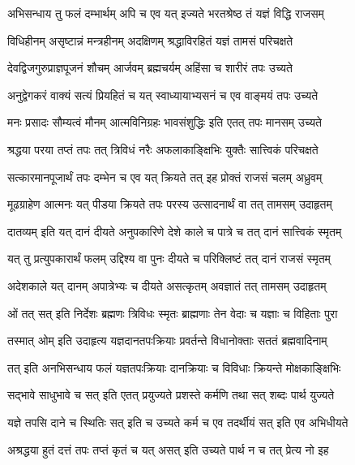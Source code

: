 \twolineshloka
{अभिसन्धाय तु फलं दम्भार्थम् अपि च एव यत्}
{इज्यते भरतश्रेष्ठ तं यज्ञं विद्धि राजसम्}%

\twolineshloka
{विधिहीनम् असृष्टान्नं मन्त्रहीनम् अदक्षिणम्}
{श्रद्धाविरहितं यज्ञं तामसं परिचक्षते}%

\twolineshloka
{देवद्विजगुरुप्राज्ञपूजनं शौचम् आर्जवम्}
{ब्रह्मचर्यम् अहिंसा च शारीरं तपः उच्यते}%

\twolineshloka
{अनुद्वेगकरं वाक्यं सत्यं प्रियहितं च यत्}
{स्वाध्यायाभ्यसनं च एव वाङ्मयं तपः उच्यते}%

\twolineshloka
{मनः प्रसादः सौम्यत्वं मौनम् आत्मविनिग्रहः}
{भावसंशुद्धिः इति एतत् तपः मानसम् उच्यते}%

\twolineshloka
{श्रद्धया परया तप्तं तपः तत् त्रिविधं नरैः}
{अफलाकाङ्क्षिभिः युक्तैः सात्त्विकं परिचक्षते}%

\twolineshloka
{सत्कारमानपूजार्थं तपः दम्भेन च एव यत्}
{क्रियते तत् इह प्रोक्तं राजसं चलम् अध्रुवम्}%

\twolineshloka
{मूढग्राहेण आत्मनः यत् पीडया क्रियते तपः}
{परस्य उत्सादनार्थं वा तत् तामसम् उदाहृतम्}%

\twolineshloka
{दातव्यम् इति यत् दानं दीयते अनुपकारिणे}
{देशे काले च पात्रे च तत् दानं सात्त्विकं स्मृतम्}%

\twolineshloka
{यत् तु प्रत्युपकारार्थं फलम् उद्दिश्य वा पुनः}
{दीयते च परिक्लिष्टं तत् दानं राजसं स्मृतम्}%

\twolineshloka
{अदेशकाले यत् दानम् अपात्रेभ्यः च दीयते}
{असत्कृतम् अवज्ञातं तत् तामसम् उदाहृतम्}%

\twolineshloka
{ओं तत् सत् इति निर्देशः ब्रह्मणः त्रिविधः स्मृतः}
{ब्राह्मणाः तेन वेदाः च यज्ञाः च विहिताः पुरा}%

\twolineshloka
{तस्मात् ओम् इति उदाहृत्य यज्ञदानतपःक्रियाः}
{प्रवर्तन्ते विधानोक्ताः सततं ब्रह्मवादिनाम्}%

\twolineshloka
{तत् इति अनभिसन्धाय फलं यज्ञतपःक्रियाः}
{दानक्रियाः च विविधाः क्रियन्ते मोक्षकाङ्क्षिभिः}%

\twolineshloka
{सद्भावे साधुभावे च सत् इति एतत् प्रयुज्यते}
{प्रशस्ते कर्मणि तथा सत् शब्दः पार्थ युज्यते}%

\twolineshloka
{यज्ञे तपसि दाने च स्थितिः सत् इति च उच्यते}
{कर्म च एव तदर्थीयं सत् इति एव अभिधीयते}%

\twolineshloka
{अश्रद्धया हुतं दत्तं तपः तप्तं कृतं च यत्}
{असत् इति उच्यते पार्थ न च तत् प्रेत्य नो इह}%

